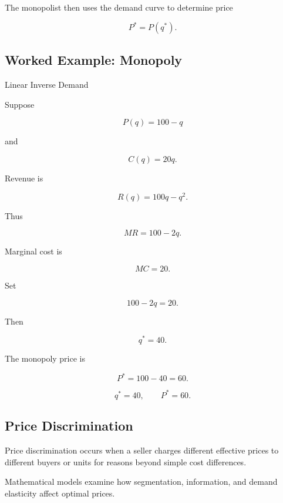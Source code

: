 The monopolist then uses the demand curve to determine price

\[
\boxed{
P^*=P(q^*).
}
\]

\subsection{Worked Example: Monopoly}
\label{subsec:worked-monopoly}

\begin{workedexamplebox}{Linear Inverse Demand}

Suppose

\[
P(q)=100-q
\]

and

\[
C(q)=20q.
\]

Revenue is

\[
R(q)
=
100q-q^2.
\]

Thus

\[
MR
=
100-2q.
\]

Marginal cost is

\[
MC=20.
\]

Set

\[
100-2q=20.
\]

Then

\[
q^*=40.
\]

The monopoly price is

\[
P^*
=
100-40
=
60.
\]

\begin{answerbox}
\[
\boxed{
q^*=40,
\qquad
P^*=60.
}
\]
\end{answerbox}

\end{workedexamplebox}

\subsection{Price Discrimination}
\label{subsec:price-discrimination}

Price discrimination occurs when a seller charges different effective prices
to different buyers or units for reasons beyond simple cost differences.

Mathematical models examine how segmentation, information, and demand
elasticity affect optimal prices.

